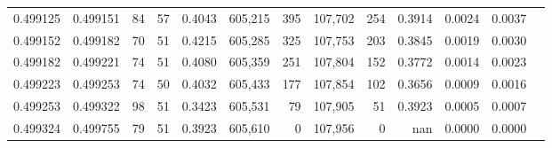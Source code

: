 \begin{tabular}{rrrrrrrrrrrrr}
0.499125 & 0.499151 &    84 &  57 &                                     0.4043 & 605,215 &     395 & 107,702 &     254 & 0.3914 & 0.0024 & 0.0037 \\
0.499152 & 0.499182 &    70 &  51 &                                     0.4215 & 605,285 &     325 & 107,753 &     203 & 0.3845 & 0.0019 & 0.0030 \\
0.499182 & 0.499221 &    74 &  51 &                                     0.4080 & 605,359 &     251 & 107,804 &     152 & 0.3772 & 0.0014 & 0.0023 \\
0.499223 & 0.499253 &    74 &  50 &                                     0.4032 & 605,433 &     177 & 107,854 &     102 & 0.3656 & 0.0009 & 0.0016 \\
0.499253 & 0.499322 &    98 &  51 &                                     0.3423 & 605,531 &      79 & 107,905 &      51 & 0.3923 & 0.0005 & 0.0007 \\
0.499324 & 0.499755 &    79 &  51 &                                     0.3923 & 605,610 &       0 & 107,956 &       0 &    nan & 0.0000 & 0.0000 \\
\bottomrule
\end{tabular}
